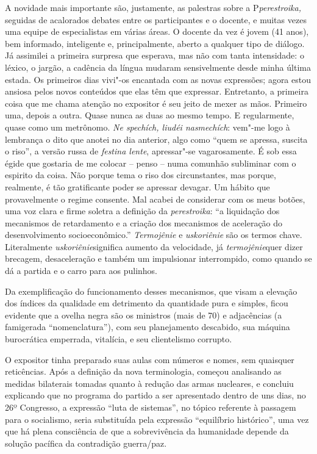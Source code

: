 A novidade mais importante são, justamente, as palestras sobre a
P\emph{perestroika,} seguidas de acalorados debates entre os
participantes e o docente, e muitas vezes uma equipe de especialistas em
várias áreas. O docente da vez é jovem (41 anos), bem informado,
inteligente e, principalmente, aberto a qualquer tipo de diálogo. Já
assimilei a primeira surpresa que esperava, mas não com tanta
intensidade: o léxico, o jargão, a cadência da língua mudaram
sensivelmente desde minha última estada. Os primeiros dias vivi"-os
encantada com as novas expressões; agora estou ansiosa pelos novos
conteúdos que elas têm que expressar. Entretanto, a primeira coisa que
me chama atenção no expositor é seu jeito de mexer as mãos. Primeiro
uma, depois a outra. Quase nunca as duas ao mesmo tempo. E regularmente,
quase como um metrônomo. \emph{Ne spechích, liudéi nasmechích}: vem"-me
logo à lembrança o dito que anotei no dia anterior, algo como ``quem se
apressa, suscita o riso'', a versão russa de \emph{festina lente},
apressar"-se vagarosamente. É sob essa égide que gostaria de me colocar
-- penso -- numa comunhão subliminar com o espirito da coisa. Não porque
tema o riso dos circunstantes, mas porque, realmente, é tão gratificante
poder se apressar devagar. Um hábito que provavelmente o regime
consente. Mal acabei de considerar com os meus botões, uma voz clara e
firme soletra a definição da \emph{perestroika}: ``a liquidação dos
mecanismos de retardamento e a criação dos mecanismos de aceleração do
desenvolvimento socioeconômico.'' \emph{Termojênie} e \emph{uskoriênie}
são os termos chave. Literalmente \emph{uskoriênie}significa aumento da
velocidade, já \emph{termojênie}quer dizer brecagem, desaceleração e
também um impulsionar interrompido, como quando se dá a partida e o
carro para aos pulinhos.

Da exemplificação do funcionamento desses mecanismos, que visam a
elevação dos índices da qualidade em detrimento da quantidade pura e
simples, ficou evidente que a ovelha negra são os ministros (mais de 70)
e adjacências (a famigerada ``nomenclatura''), com seu planejamento
descabido, sua máquina burocrática emperrada, vitalícia, e seu
clientelismo corrupto.

O expositor tinha preparado suas aulas com números e nomes, sem
quaisquer reticências. Após a definição da nova terminologia, começou
analisando as medidas bilaterais tomadas quanto à redução das armas
nucleares, e concluiu explicando que no programa do partido a ser
apresentado dentro de uns dias, no 26º Congresso, a expressão ``luta de
sistemas'', no tópico referente à passagem para o socialismo, seria
substituída pela expressão ``equilíbrio histórico'', uma vez que há
plena consciência de que a sobrevivência da humanidade depende da
solução pacífica da contradição guerra/paz.

